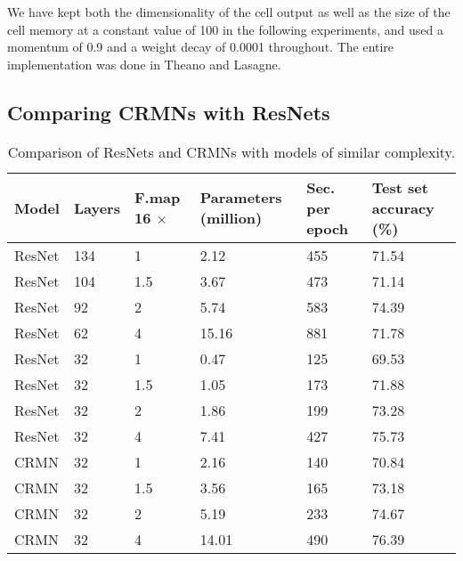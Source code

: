 \documentclass{article}
\begin{document}
We have kept both the dimensionality of the cell output as well as the size of the cell memory at a constant value of 100 in the following experiments, and used a momentum of 0.9 and a weight decay of 0.0001 throughout. The entire implementation was done in Theano \cite{2016arXiv160502688short} and Lasagne.

\subsection{Comparing CRMNs with ResNets}

\begin{table}[htb!]
\centering
\begin{tabular}{ p{1.5cm}  p{.9cm} p{.7cm}  p{1.7cm}  p{1.5cm}  p{1.9cm}  }
 \hline
Model & Layers & F.map 16 $\times$ & Parameters \newline (million) &  Sec. per \newline epoch  & Test set \newline accuracy (\%)   \\ \hline
ResNet	&  134 &	1	& 2.12  &	455  &	71.54 \\ 
ResNet	&  104 &	1.5	& 3.67  &	473  &	71.14 \\ 
ResNet	&  92  &	2	& 5.74  &	583  &	74.39 \\ 
ResNet	&  62  &	4	& 15.16 &	881  &	71.78 \\ \hline 
ResNet  &  32  &  1	    & 0.47 &	125  & 69.53 \\ 
ResNet  &  32  &  1.5   & 1.05 &	173  & 71.88 \\ 
ResNet  &  32  &  2	    & 1.86 &	199  & 73.28 \\ 
ResNet  &  32  &  4	    & 7.41 &	427  & 75.73 \\ \hline 
CRMN    &  32  &	1	& 2.16  &	140 &   70.84 \\ 
CRMN    &  32  &	1.5	& 3.56  &	165 &	73.18 \\ 
CRMN    &  32  &	2	& 5.19  &	233 &   74.67 \\ 
CRMN    &  32  &	4	& 14.01 &	490 &	76.39 \\ \hline %
\end{tabular}
\caption{Comparison of ResNets and CRMNs with models of similar complexity.}
\label{explore}
\end{table}
\end{document}

